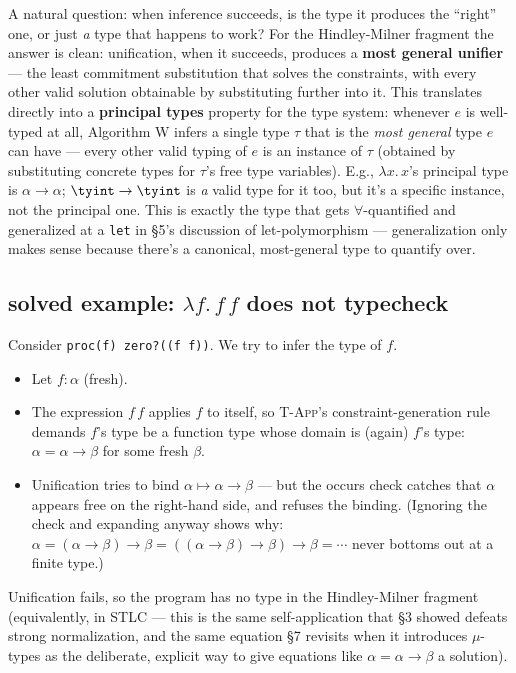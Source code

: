 A natural question: when inference succeeds, is the type it produces the ``right'' one, or just \emph{a} type that happens to work? For the Hindley-Milner fragment the answer is clean: unification, when it succeeds, produces a \textbf{most general unifier} — the least commitment substitution that solves the constraints, with every other valid solution obtainable by substituting further into it. This translates directly into a \textbf{principal types} property for the type system: whenever $e$ is well-typed at all, Algorithm W infers a single type $\tau$ that is the \emph{most general} type $e$ can have — every other valid typing of $e$ is an instance of $\tau$ (obtained by substituting concrete types for $\tau$'s free type variables). E.g., $\lambda x.\,x$'s principal type is $\alpha\to\alpha$; $\tyint\to\tyint$ is \emph{a} valid type for it too, but it's a specific instance, not the principal one. This is exactly the type that gets $\forall$-quantified and generalized at a \lstinline|let| in \S5's discussion of let-polymorphism — generalization only makes sense because there's a canonical, most-general type to quantify over.

\subsection{solved example: $\lambda f.\, f\, f$ does not typecheck}

Consider \lstinline|proc(f) zero?((f f))|. We try to infer the type of $f$.

\begin{itemize}
  \item Let $f : \alpha$ (fresh).
  \item The expression $f\, f$ applies $f$ to itself, so \textsc{T-App}'s constraint-generation rule demands $f$'s type be a function type whose domain is (again) $f$'s type: $\alpha = \alpha \to \beta$ for some fresh $\beta$.
  \item Unification tries to bind $\alpha \mapsto \alpha\to\beta$ — but the occurs check catches that $\alpha$ appears free on the right-hand side, and refuses the binding. (Ignoring the check and expanding anyway shows why: $\alpha = (\alpha\to\beta)\to\beta = ((\alpha\to\beta)\to\beta)\to\beta = \cdots$ never bottoms out at a finite type.)
\end{itemize}

Unification fails, so the program has no type in the Hindley-Milner fragment (equivalently, in STLC — this is the same self-application that \S3 showed defeats strong normalization, and the same equation \S7 revisits when it introduces $\mu$-types as the deliberate, explicit way to give equations like $\alpha=\alpha\to\beta$ a solution).

